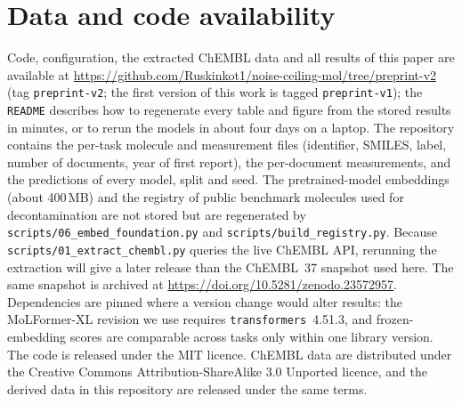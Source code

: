 \section{Data and code availability}
Code, configuration, the extracted ChEMBL data and all results of this paper are available at \url{https://github.com/Ruskinkot1/noise-ceiling-mol/tree/preprint-v2} (tag \texttt{preprint-v2}; the first version of this work is tagged \texttt{preprint-v1}); the \texttt{README} describes how to regenerate every table and figure from the stored results in minutes, or to rerun the models in about four days on a laptop. The repository contains the per-task molecule and measurement files (identifier, SMILES, label, number of documents, year of first report), the per-document measurements, and the predictions of every model, split and seed. The pretrained-model embeddings (about 400\,MB) and the registry of public benchmark molecules used for decontamination are not stored but are regenerated by \texttt{scripts/06\_embed\_foundation.py} and \texttt{scripts/build\_registry.py}. Because \texttt{scripts/01\_extract\_chembl.py} queries the live ChEMBL API, rerunning the extraction will give a later release than the ChEMBL~37 snapshot used here. The same snapshot is archived at \url{https://doi.org/10.5281/zenodo.23572957}. Dependencies are pinned where a version change would alter results: the MoLFormer-XL revision we use requires \texttt{transformers}~4.51.3, and frozen-embedding scores are comparable across tasks only within one library version. The code is released under the MIT licence. ChEMBL data are distributed under the Creative Commons Attribution-ShareAlike 3.0 Unported licence, and the derived data in this repository are released under the same terms.
